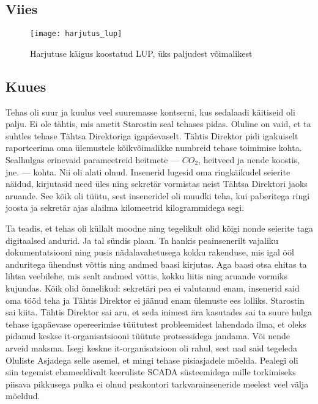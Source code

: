 \documentclass[nobib]{tufte-handout}
\begin{document}
\subsection{Viies}

\begin{figure}%
\begin{center}
  \texttt{[image: harjutus\_lup]}
  \caption{Harjutuse käigus koostatud LUP, üks paljudest võimalikest}
  \label{fig:harjutus}
\end{center}
\end{figure}

\subsection{Kuues}
 Tehas oli suur ja kuulus veel suuremasse kontserni, kus sedalaadi käitiseid oli palju. Ei ole tähtis, mis ametit Starostin seal tehases pidas. Oluline on vaid, et ta suhtles tehase Tähtsa Direktoriga igapäevaselt. Tähtis Direktor pidi igakuiselt raporteerima oma ülemustele kõikvõimalikke numbreid tehase toimimise kohta. Sealhulgas erinevaid parameetreid heitmete --- $CO_2$, heitveed ja nende koostis, jne. --- kohta. Nii oli alati olnud. Insenerid lugesid oma ringkäikudel seierite näidud, kirjutasid need üles ning sekretär vormistas neist Tähtsa Direktori jaoks aruande. See kõik oli tüütu, sest inseneridel oli muudki teha, kui paberitega ringi joosta ja sekretär ajas alailma kilomeetrid kilogrammidega segi. 

 Ta teadis, et tehas oli küllalt moodne ning tegelikult olid kõigi nonde seierite taga digitaalsed andurid. Ja tal sündis plaan. Ta hankis peainsenerilt vajaliku dokumentatsiooni ning pusis nädalavahetusega kokku rakenduse, mis igal ööl anduritega ühendust võttis ning andmed baasi kirjutas. Aga baasi otsa ehitas ta lihtsa veebilehe, mis sealt andmed võttis, kokku liitis ning aruande vormiks kujundas. Kõik olid õnnelikud: sekretäri pea ei valutanud enam, insenerid said oma tööd teha ja Tähtis Direktor ei jäänud enam ülemuste ees lolliks. Starostin sai kiita. Tähtis Direktor sai aru, et seda inimest ära kasutades sai ta suure hulga tehase igapäevase opereerimise tüütutest probleemidest lahendada ilma, et oleks pidanud keskse it-organisatsiooni tüütute protsessidega jandama. Või nende arveid maksma. Isegi keskne it-organisatsioon oli rahul, sest nad said tegeleda Oluliste Asjadega selle asemel, et mingi tehase pisiasjadele mõelda. Pealegi oli siin tegemist ebameeldivalt keeruliste SCADA süsteemidega mille torkimiseks piisava pikkusega pulka ei olnud peakontori tarkvarainseneride meelest veel välja mõeldud. 
\end{document}
